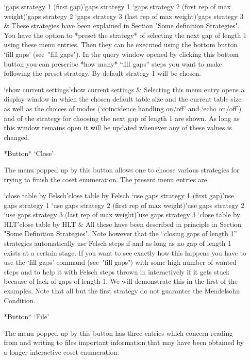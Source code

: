 \>`gaps strategy 1 (first gap)'{gaps strategy 1}
\>`gaps strategy 2 (first rep of max weight)'{gaps strategy 2}
\>`gaps strategy 3 (last rep of max weight)'{gaps strategy 3} &
  These strategies have been explained in Section "Some definition
  Strategies". You have the option to *preset the strategy* of
  selecting the next gap of length 1 using these menu entries. Then
  they can be executed using the bottom button `fill gaps' (see~"fill
  gaps"). In the query window opened by clicking this bottom button
  you can prescribe *how many* ``fill gaps'' steps you want to make
  following the preset strategy. By default strategy 1 will be chosen.

\>`show current settings'{show current settings} &
  Selecting this menu entry opens a display window in which the chosen
  default table size and the current table size as well as the choices
  of modes (`coincidence handling on/off' and `echo on/off') and of the
  strategy for choosing the next gap of length 1 are shown. As long as
  this window remains open it will be updated whenever any of these
  values is changed.

\enditems

*Button* `Close'

The menu popped up by this button allows one to choose various strategies
for trying to finish the coset enumeration. The present menu entries
are

\beginitems

\>`close table by Felsch'{close table by Felsch}
\>`use gaps strategy 1 (first gap)'{use gaps strategy 1}
\>`use gaps strategy 2 (first rep of max weight)'{use gaps strategy 2}
\>`use gaps strategy 3 (last rep of max weight)'{use gaps strategy 3}
\>`close table by HLT'{close table by HLT} &
  All these have been described in principle in Section "Some Definition
  Strategies". Note however that the ``closing gaps of length 1''
  strategies automatically use Felsch steps if and as long as no gap of
  length 1 exists at a certain stage. If you want to see exactly how
  this happens you have to use the `fill gaps' command (see~"fill gaps")
  with some high number of wanted steps and to help it with Felsch steps
  thrown in interactively if it gets stuck because of lack of gaps of
  length 1. We will demonstrate this in the first of the examples.
  Note that all but the first strategy do not guarantee the Mendelsohn
  Condition.

\enditems

*Button* `File'

The menu popped up by this button has three entries which concern
reading from and writing to files important information that may have
been obtained by a longer interactive coset enumeration:

